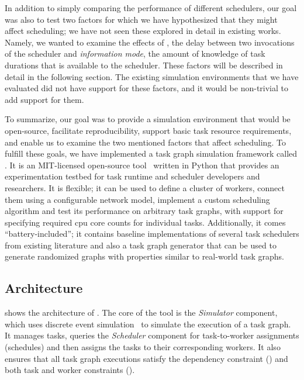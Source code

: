 In addition to simply comparing the performance of different schedulers, our goal was also to test
two factors for which we have hypothesized that they might affect scheduling; we have not seen
these explored in detail in existing works. Namely, we wanted to examine the effects of
, the delay between two invocations of the scheduler and
\emph{information mode}, the amount of knowledge of task durations that is available to the
scheduler. These factors will be described in detail in the following section. The existing
simulation environments that we have evaluated did not have support for these factors, and it would
be non-trivial to add support for them.

To summarize, our goal was to provide a simulation environment that would be open-source,
facilitate reproducibility, support basic task resource requirements, and enable us to examine the
two mentioned factors that affect scheduling. To fulfill these goals, we have implemented a task
graph simulation framework called \estee{}. It is an \mbox{MIT-licensed}
open-source tool~\cite{estee_github} written in Python that provides an experimentation testbed
for task runtime and scheduler developers and researchers. It is flexible; it can be used to define
a cluster of workers, connect them using a configurable network model, implement a custom
scheduling algorithm and test its performance on arbitrary task graphs, with support for specifying
required \gls{cpu} core counts for individual tasks. Additionally, it comes
``battery-included''; it contains baseline implementations of several task schedulers from existing
literature and also a task graph generator that can be used to generate randomized graphs with
properties similar to real-world task graphs.

\subsection{Architecture}
 shows the architecture of \estee{}. The core of the
tool is the \emph{Simulator} component, which uses discrete event
simulation~\cite{discrete_event_simulation} to simulate the execution of a task graph. It manages tasks,
queries the \emph{Scheduler} component for task-to-worker assignments (schedules) and then
assigns the tasks to their corresponding workers. It also ensures that all task graph executions satisfy
the dependency constraint () and both task and worker constraints
().

